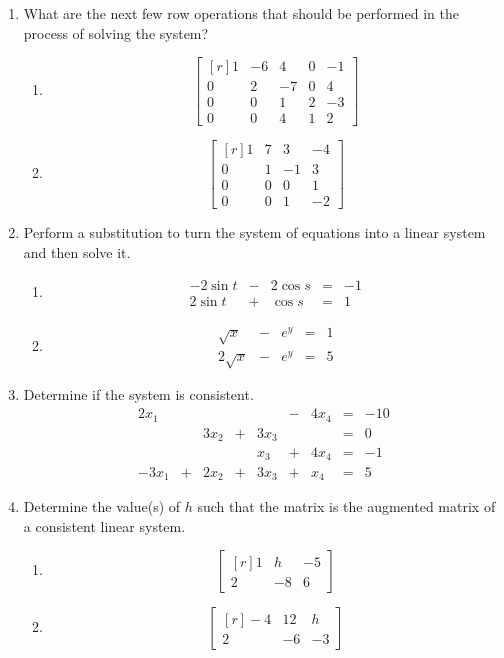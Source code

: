 \documentclass[12pt]{article}
\begin{document}
\begin{multicols*}{2}
\begin{enumerate}
		\item What are the next few row operations that should be performed in the process of solving the system?
		\begin{enumerate}
			\item
			\[
			\begin{bmatrix*}[r]
				1 & -6 & 4 & 0 & -1\\
				0 & 2 & -7 & 0 & 4\\
				0 & 0 & 1 & 2 & -3\\
				0 & 0 & 4 & 1 & 2
			\end{bmatrix*}
			\]
			\vfill
			\item \[
			\begin{bmatrix*}[r]
				1 & 7 & 3 & -4\\
				0 & 1 & -1 & 3\\
				0 & 0 & 0 & 1\\
				0 & 0 & 1 & -2
			\end{bmatrix*}
			\]
			\vfill
		\end{enumerate}
		\item Perform a substitution to turn the system of equations into a linear system and then solve it.
		\begin{enumerate}
			\item \[
			\begin{array}{ccccc}
				-2\sin t & -& 2\cos s & = & -1\\
				2\sin t & + & \cos s & = & 1
			\end{array}
			\]
			\vfill
			\item \[
			\begin{array}{ccccc}
				\sqrt{x} & - & e^y &=&1\\
				2\sqrt{x}&-&e^y &=&5
			\end{array}
			\]
			\vfill\null\pagebreak
		\end{enumerate}

		\item Determine if the system is consistent.
		\[
		\begin{array}{ccccccccc}
			2x_1&&&&&-&4x_4&=&-10\\
			&&3x_2&+&3x_3&&&=&0\\
			&&&&x_3&+&4x_4&=&-1\\
			-3x_1&+&2x_2&+&3x_3&+&x_4&=&5
		\end{array}
		\]
		\vfill

		\item Determine the value(s) of $h$ such that the matrix is the augmented matrix of a consistent linear system.
		\begin{enumerate}
			\item \[
			\begin{bmatrix*}[r]
				1&h&-5\\
				2&-8&6
			\end{bmatrix*}
			\]
			\vfill
			\item \[
			\begin{bmatrix*}[r]
				-4 & 12 & h\\
				2 & -6 & -3
			\end{bmatrix*}
			\]
			\vfill
		\end{enumerate}


\end{enumerate}
\end{multicols*}
\end{document}
